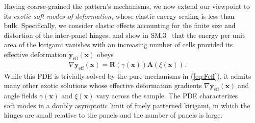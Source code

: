 \documentclass[aps,prl,twocolumn,superscriptaddress]{revtex4-1}
\begin{document}
Having coarse-grained the pattern's mechanisms, we now extend our viewpoint to its \textit{exotic soft modes of deformation}, whose elastic energy scaling is less than bulk. Specifically, we consider elastic effects accounting for the finite size and distortion of the inter-panel hinges, and show in SM.3~\cite{suppl} that the energy per unit area of the kirigami vanishes with an increasing number of cells provided its effective deformation $\mathbf{y}_{\text{eff}}(\mathbf{x})$ obeys 
\begin{equation}
\begin{aligned}\label{eq:effectiveDescription}
\nabla \mathbf{y}_{\text{eff}}(\mathbf{x}) = \mathbf{R}(\gamma(\mathbf{x})) \mathbf{A}(\xi(\mathbf{x})).
\end{aligned}
\end{equation} 
While this PDE is trivially solved by the pure mechanisms in (\ref{eq:Feff}), it admits many other exotic solutions whose effective deformation gradients $\nabla\mathbf{y}_\text{eff}(\mathbf{x})$ and angle fields $\gamma(\mathbf{x})$ and $\xi(\mathbf{x})$ vary across the sample. 
The PDE characterizes soft modes in a doubly asymptotic limit of finely patterned kirigami, in which the hinges are small relative to the panels and the number of panels is large.
\end{document}
